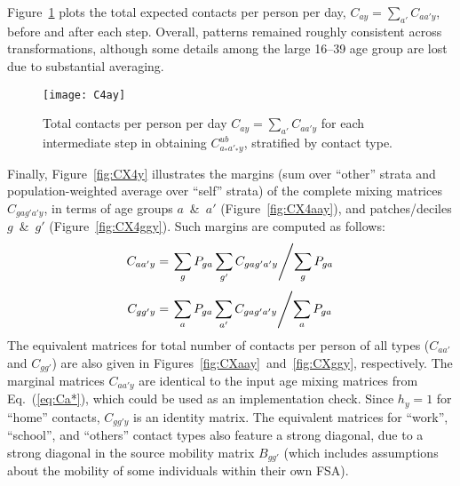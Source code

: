 \par
Figure~\ref{fig:C4Ay} plots the total expected contacts per person per day,
$C_{ay} = \sum_{a'} C_{aa'y}$, before and after each step.
Overall, patterns remained roughly consistent across transformations,
although some details among the large 16--39 age group are lost due to substantial averaging.
\begin{figure}
  \centering
  \texttt{[image: C4ay]}
  \caption{Total contacts per person per day $C_{ay} = \sum_{a'} C_{aa'y}$
    for each intermediate step in obtaining $C^{ub}_{a_*a'_*y}$,
    stratified by contact type.}
  \label{fig:C4Ay}
\end{figure}
\par
Finally, Figure~\ref{fig:CX4y} illustrates the margins
(sum over ``other'' strata and population-weighted average over ``self'' strata)
of the complete mixing matrices $C_{gag'a'y}$, in terms of
age groups $a$~\&~$a'$ (Figure~\ref{fig:CX4aay}), and
patches/deciles $g$~\&~$g'$ (Figure~\ref{fig:CX4ggy}).
Such margins are computed as follows:
\begin{equation}\label{eq:Caay}
  C_{aa'y} = \left.\sum_{g} P_{ga} \sum_{g'} C_{gag'a'y} \middle/ \sum_{g} P_{ga} \right.
\end{equation}
\begin{equation}\label{eq:Cggy}
  C_{gg'y} = \left.\sum_{a} P_{ga} \sum_{a'} C_{gag'a'y} \middle/ \sum_{a} P_{ga} \right.
\end{equation}
The equivalent matrices for total number of contacts per person of all types
($C_{aa'}$ and $C_{gg'}$) are also given in Figures~\ref{fig:CXaay}~and~\ref{fig:CXggy}, respectively.
The marginal matrices $C_{aa'y}$ are identical to the input age mixing matrices from Eq.~(\ref{eq:Ca*}),
which could be used as an implementation check.
Since $h_y = 1$ for ``home'' contacts, $C_{gg'y}$ is an identity matrix.
The equivalent matrices for ``work'', ``school'', and ``others'' contact types
also feature a strong diagonal, due to a strong diagonal in the source mobility matrix $B_{gg'}$
(which includes assumptions about the mobility of some individuals within their own FSA).
